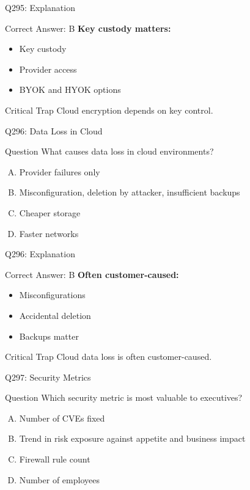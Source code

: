 \documentclass{beamer}
\begin{document}
	\begin{frame}{Q295: Explanation}
		\begin{block}{Correct Answer: B}
			\textbf{Key custody matters:}
			\begin{itemize}
				\item Key custody
				\item Provider access
				\item BYOK and HYOK options
			\end{itemize}
		\end{block}
		\begin{alertblock}{Critical Trap}
			Cloud encryption depends on key control.
		\end{alertblock}
	\end{frame}
	
	\begin{frame}{Q296: Data Loss in Cloud}
		\begin{block}{Question}
			What causes data loss in cloud environments?
		\end{block}
		\begin{enumerate}[(A)]
			\item Provider failures only
			\item Misconfiguration, deletion by attacker, insufficient backups
			\item Cheaper storage
			\item Faster networks
		\end{enumerate}
	\end{frame}
	
	\begin{frame}{Q296: Explanation}
		\begin{block}{Correct Answer: B}
			\textbf{Often customer-caused:}
			\begin{itemize}
				\item Misconfigurations
				\item Accidental deletion
				\item Backups matter
			\end{itemize}
		\end{block}
		\begin{alertblock}{Critical Trap}
			Cloud data loss is often customer-caused.
		\end{alertblock}
	\end{frame}
	
	\begin{frame}{Q297: Security Metrics}
		\begin{block}{Question}
			Which security metric is most valuable to executives?
		\end{block}
		\begin{enumerate}[(A)]
			\item Number of CVEs fixed
			\item Trend in risk exposure against appetite and business impact
			\item Firewall rule count
			\item Number of employees
		\end{enumerate}
	\end{frame}
	
\end{document}
